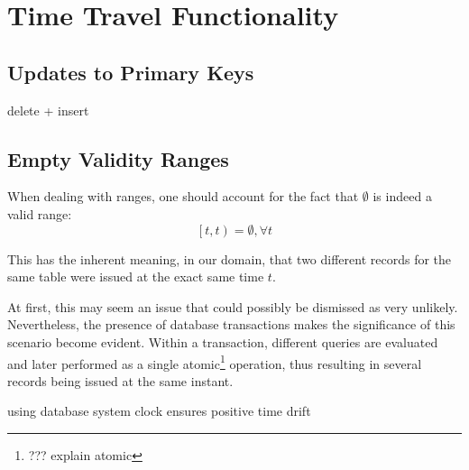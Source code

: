 \chapter{Time Travel Functionality}
\label{ch:timetravel}

%	


\section{Updates to Primary Keys}

delete + insert


\section{Empty Validity Ranges}

When dealing with ranges, one should account for the fact that $\emptyset$ is indeed a valid range:
$$
\left[t, t\right) = \emptyset, \forall t
$$

This has the inherent meaning, in our domain, that two different records for the same table were issued at the exact same time $t$.

At first, this may seem an issue that could possibly be dismissed as very unlikely.
Nevertheless, the presence of database transactions makes the significance of this scenario become evident.
Within a transaction, different queries are evaluated and later performed as a single atomic\footnote{??? explain atomic} operation, thus resulting in several records being issued at the same instant.

using database system clock ensures positive time drift


